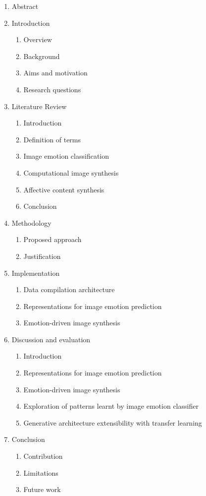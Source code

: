 \documentclass{article}
\begin{document}
\begin{enumerate}[label*=\arabic*.]
	\item Abstract
	\item Introduction
	\begin{enumerate}[label*=\arabic*.]
		\item Overview
		\item Background
		\item Aims and motivation
		\item Research questions
	\end{enumerate}
	
	\item Literature Review
	\begin{enumerate}[label*=\arabic*.]
		\item Introduction
		\item Definition of terms
		\item Image emotion classification
		\item Computational image synthesis
		\item Affective content synthesis
		\item Conclusion
	\end{enumerate}

	\item Methodology
	\begin{enumerate}[label*=\arabic*.]
		\item Proposed approach
		\item Justification
	\end{enumerate}
	
	\item Implementation
	\begin{enumerate}[label*=\arabic*.]
		\item Data compilation architecture
		\item Representations for image emotion prediction
		\item Emotion-driven image synthesis
	\end{enumerate}
	
	\item Discussion and evaluation
	\begin{enumerate}[label*=\arabic*.]
		\item Introduction
		\item Representations for image emotion prediction
		\item Emotion-driven image synthesis
		\item Exploration of patterns learnt by image emotion classifier
		\item Generative architecture extensibility with transfer learning
	\end{enumerate}
	
	\item Conclusion
	\begin{enumerate}[label*=\arabic*.]
		\item Contribution
		\item Limitations
		\item Future work
	\end{enumerate}
\end{enumerate}
\end{document}
